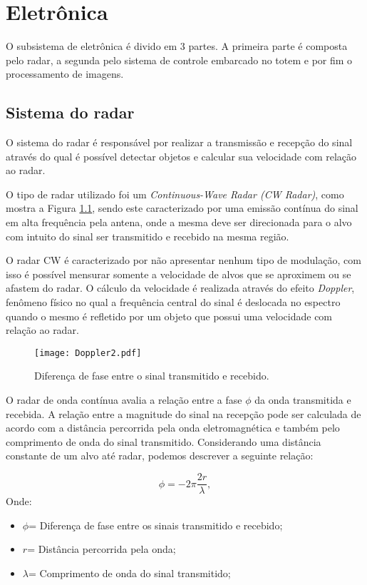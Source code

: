 
\chapter{Eletrônica}

O subsistema de eletrônica é divido em 3 partes. A primeira parte é composta pelo radar, a segunda pelo sistema de controle embarcado no totem e por fim o processamento de imagens. 


\section{Sistema do radar}
O sistema do radar é responsável por realizar a transmissão e recepção do sinal através do qual é possível detectar objetos e calcular sua velocidade com relação ao radar.

O tipo de radar utilizado foi um \emph{Continuous-Wave Radar (CW Radar)}, como mostra a Figura \ref{Doppler1}, sendo este caracterizado por uma emissão contínua do sinal em alta frequência pela antena, onde a mesma deve ser direcionada para o alvo com intuito do sinal ser transmitido e recebido na mesma região. 

O radar CW \cite{CW} é caracterizado por não apresentar nenhum tipo de modulação, com isso é possível mensurar somente a velocidade de alvos que se aproximem ou se afastem do radar. O cálculo da velocidade é realizada através do efeito  \emph{Doppler}, fenômeno físico no qual a frequência central do sinal é deslocada no espectro quando o mesmo é refletido por um objeto que possui uma velocidade com relação ao radar. 
\begin{figure}[H]
    \centering
   \texttt{[image: Doppler2.pdf]}
   \caption{Diferença de fase entre o sinal transmitido e recebido.}
   \label{Doppler1}
    \end{figure}

O radar de onda contínua avalia a relação entre a fase $\phi$ da onda transmitida e recebida. A relação entre a magnitude do sinal na recepção pode ser calculada de acordo com a distância percorrida pela onda eletromagnética e também pelo comprimento de onda do sinal transmitido. Considerando uma distância constante de um alvo até radar, podemos descrever a seguinte relação: 

\begin{equation}
    \label{fase_1_doppler}
    \phi = -2\pi\frac{2r}{\lambda},
\end{equation}
Onde:
\begin{itemize}
    \item $\phi$= Diferença de fase entre os sinais transmitido e recebido;
    \item $r$= Distância percorrida pela onda;
    \item $\lambda$= Comprimento de onda do sinal transmitido;
\end{itemize}

